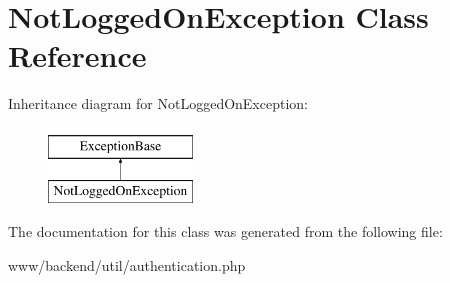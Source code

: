 \hypertarget{classNotLoggedOnException}{
\section{NotLoggedOnException Class Reference}
\label{classNotLoggedOnException}
}
Inheritance diagram for NotLoggedOnException:\begin{figure}[H]
\begin{center}
\leavevmode
\includegraphics[height=2.000000cm]{classNotLoggedOnException}
\end{center}
\end{figure}


The documentation for this class was generated from the following file:\begin{DoxyCompactItemize}
\item 
www/backend/util/authentication.php\end{DoxyCompactItemize}
